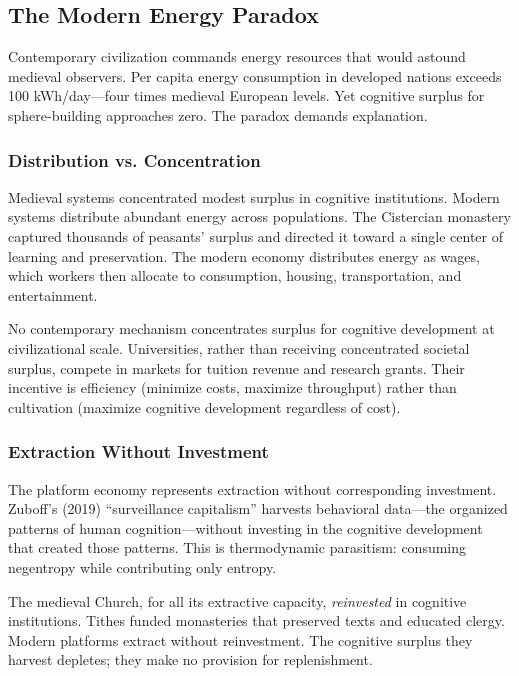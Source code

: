 \subsection{The Modern Energy Paradox}

Contemporary civilization commands energy resources that would astound medieval observers. Per capita energy consumption in developed nations exceeds 100 kWh/day---four times medieval European levels. Yet cognitive surplus for sphere-building approaches zero. The paradox demands explanation.

\subsubsection{Distribution vs. Concentration}

Medieval systems concentrated modest surplus in cognitive institutions. Modern systems distribute abundant energy across populations. The Cistercian monastery captured thousands of peasants' surplus and directed it toward a single center of learning and preservation. The modern economy distributes energy as wages, which workers then allocate to consumption, housing, transportation, and entertainment.

No contemporary mechanism concentrates surplus for cognitive development at civilizational scale. Universities, rather than receiving concentrated societal surplus, compete in markets for tuition revenue and research grants. Their incentive is efficiency (minimize costs, maximize throughput) rather than cultivation (maximize cognitive development regardless of cost).

\subsubsection{Extraction Without Investment}

The platform economy represents extraction without corresponding investment. Zuboff's (2019) ``surveillance capitalism'' harvests behavioral data---the organized patterns of human cognition---without investing in the cognitive development that created those patterns. This is thermodynamic parasitism: consuming negentropy while contributing only entropy.

The medieval Church, for all its extractive capacity, \textit{reinvested} in cognitive institutions. Tithes funded monasteries that preserved texts and educated clergy. Modern platforms extract without reinvestment. The cognitive surplus they harvest depletes; they make no provision for replenishment.

